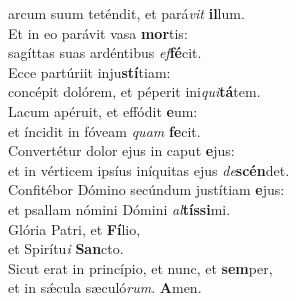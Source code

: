 \oddverse arcum suum teténdit, et pará\textit{vit} \textbf{il}lum.\\
\evenverse Et in eo parávit vasa \textbf{mor}tis:~\*\\
\evenverse sagíttas suas ardéntibus \textit{ef}\textbf{fé}cit.\\
\oddverse Ecce partúriit inju\textbf{stí}tiam:~\*\\
\oddverse concépit dolórem, et péperit ini\textit{qui}\textbf{tá}tem.\\
\evenverse Lacum apéruit, et effódit \textbf{e}um:~\*\\
\evenverse et íncidit in fóveam \textit{quam} \textbf{fe}cit.\\
\oddverse Convertétur dolor ejus in caput \textbf{e}jus:~\*\\
\oddverse et in vérticem ipsíus iníquitas ejus \textit{de}\textbf{scén}det.\\
\evenverse Confitébor Dómino secúndum justítiam \textbf{e}jus:~\*\\
\evenverse et psallam nómini Dómini \textit{al}\textbf{tís}\textbf{si}mi.\\
\oddverse Glória Patri, et \textbf{Fí}lio,~\*\\
\oddverse et Spirítu\textit{i} \textbf{San}cto.\\
\evenverse Sicut erat in princípio, et nunc, et \textbf{sem}per,~\*\\
\evenverse et in sǽcula sæculó\textit{rum}. \textbf{A}men.\\
